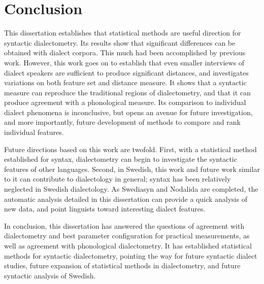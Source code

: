 \section{Conclusion}

This dissertation establishes that statistical methods are useful
direction for syntactic dialectometry. Its results show that
significant differences can be obtained with dialect corpora. This
much had been accomplished by previous work. However, this work goes
on to establish that even smaller interviews of dialect speakers are
sufficient to produce significant distances, and investigates
variations on both feature set and distance measure. It shows that a
syntactic measure can reproduce the traditional regions of
dialectometry, and that it can produce agreement with a phonological
measure. Its comparison to individual dialect phenomena is
inconclusive, but opens an avenue for future investigation, and more
importantly, future development of methods to compare and rank
individual features.

Future directions based on this work are twofold. First, with a
statistical method established for syntax, dialectometry can begin to
investigate the syntactic features of other languages. Second, in
Swedish, this work and future work similar to it can contribute to
dialectology in general; syntax has been relatively neglected in
Swedish dialectology. As Swediasyn and Nodalida are completed, the
automatic analysis detailed in this dissertation can provide a quick
analysis of new data, and point linguists toward interesting dialect
features.

In conclusion, this dissertation has answered the questions of
agreement with dialectometry and best parameter configuration for
practical measurements, as well as agreement with phonological
dialectometry. It has established statistical methods for syntactic
dialectometry, pointing the way for future syntactic dialect studies,
future expansion of statistical methods in dialectometry, and future
syntactic analysis of Swedish.

